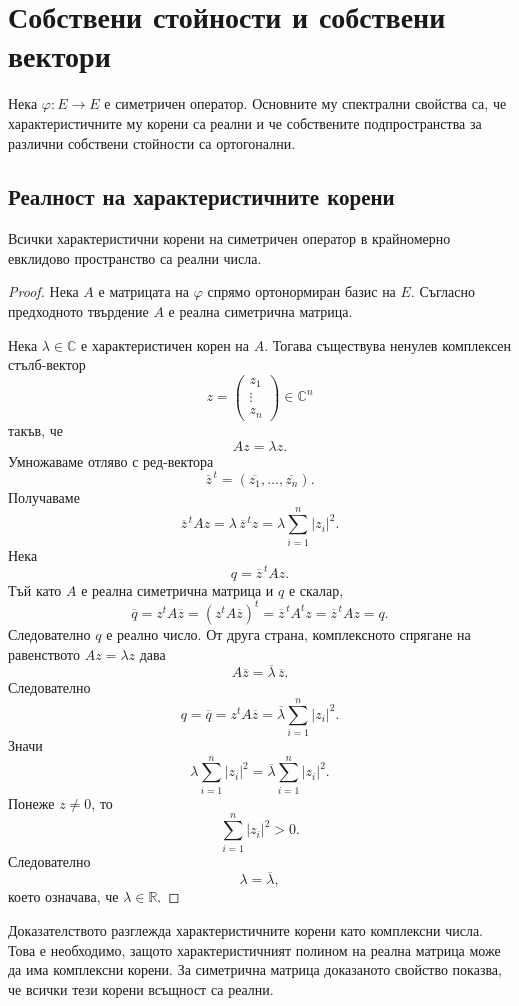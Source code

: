 \section{Собствени стойности и собствени вектори}\label{s:30.3}

Нека $\varphi:E\to E$ е симетричен оператор. Основните му спектрални свойства са, че характеристичните му корени са реални и че собствените подпространства за различни собствени стойности са ортогонални.

\subsection{Реалност на характеристичните корени}\label{s:30.3.1}

\begin{thm}
Всички характеристични корени на симетричен оператор в крайномерно евклидово пространство са реални числа.
\end{thm}

\begin{proof}
Нека $A$ е матрицата на $\varphi$ спрямо ортонормиран базис на $E$. Съгласно предходното твърдение $A$ е реална симетрична матрица.

Нека $\lambda\in\mathbb{C}$ е характеристичен корен на $A$. Тогава съществува ненулев комплексен стълб-вектор
\[
z=
\begin{pmatrix}
z_1\\
\vdots\\
z_n
\end{pmatrix}
\in\mathbb{C}^n
\]
такъв, че
\[
Az=\lambda z.
\]
Умножаваме отляво с ред-вектора
\[
\overline{z}^{\,t}=
(\overline{z_1},\ldots,\overline{z_n}).
\]
Получаваме
\[
\overline{z}^{\,t}Az
=
\lambda\,\overline{z}^{\,t}z
=
\lambda\sum_{i=1}^n |z_i|^2.
\]
Нека
\[
q=\overline{z}^{\,t}Az.
\]
Тъй като $A$ е реална симетрична матрица и $q$ е скалар,
\[
\overline q
=z^tA\overline z
=(z^tA\overline z)^t
=\overline z^{\,t}A^tz
=\overline z^{\,t}Az
=q.
\]
Следователно $q$ е реално число. От друга страна, комплексното спрягане на равенството $Az=\lambda z$ дава
\[
A\overline{z}=\overline{\lambda}\,\overline{z}.
\]
Следователно
\[
q=\overline q
=z^tA\overline z
=
\overline{\lambda}\sum_{i=1}^n |z_i|^2.
\]
Значи
\[
\lambda\sum_{i=1}^n |z_i|^2
=
\overline{\lambda}\sum_{i=1}^n |z_i|^2.
\]
Понеже $z\ne0$, то
\[
\sum_{i=1}^n |z_i|^2>0.
\]
Следователно
\[
\lambda=\overline{\lambda},
\]
което означава, че $\lambda\in\mathbb{R}$.
\end{proof}

\begin{remark}
Доказателството разглежда характеристичните корени като комплексни числа. Това е необходимо, защото характеристичният полином на реална матрица може да има комплексни корени. За симетрична матрица доказаното свойство показва, че всички тези корени всъщност са реални.
\end{remark}

